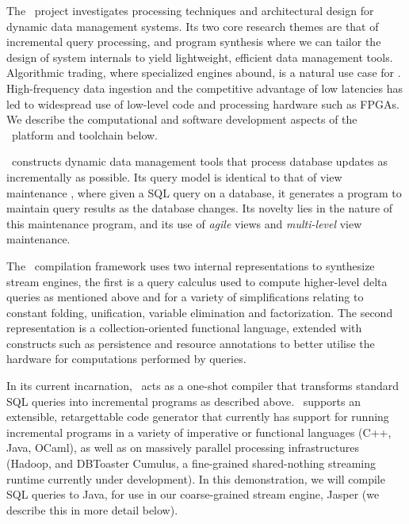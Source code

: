 \label{sec:dbtoaster}

The \compiler\ project investigates processing techniques and architectural
design for dynamic data management systems. Its two core research themes are
that of incremental query processing, and program synthesis where we can tailor
the design of system internals to yield lightweight, efficient data management
tools. Algorithmic trading, where specialized engines abound, is a natural use
case for \compiler. High-frequency data ingestion and the competitive advantage
of low latencies has led to widespread use of low-level code and processing
hardware such as FPGAs. We describe the computational and software development
aspects of the \compiler\ platform and toolchain below.

\compiler\ constructs dynamic data management tools that process database
updates as incrementally as possible. Its query model is identical to that of
view maintenance , where given a SQL query on a database,
it generates a program to maintain query results as the database changes. Its
novelty lies in the nature of this maintenance program, and its use of
\textit{agile} views and \textit{multi-level} view maintenance.

The \compiler\ compilation framework uses two internal representations to
synthesize stream engines, the first is a query calculus used to compute
higher-level delta queries as mentioned above and for a variety of
simplifications relating to constant folding, unification, variable elimination
and factorization. The second representation is a collection-oriented functional
language, extended with constructs such as persistence and resource annotations
to better utilise the hardware for computations performed by queries.



In its current incarnation, \compiler\ acts as a one-shot compiler that
transforms standard SQL queries into incremental programs as described above.
\compiler\ supports an extensible, retargettable code generator that currently
has support for running incremental programs in a variety of imperative or
functional languages (C++, Java, OCaml), as well as on massively parallel
processing infrastructures (Hadoop, and DBToaster Cumulus, a fine-grained
shared-nothing streaming runtime currently under development). In this
demonstration, we will compile SQL queries to Java, for use in our
coarse-grained stream engine, Jasper (we describe this in more detail below).


